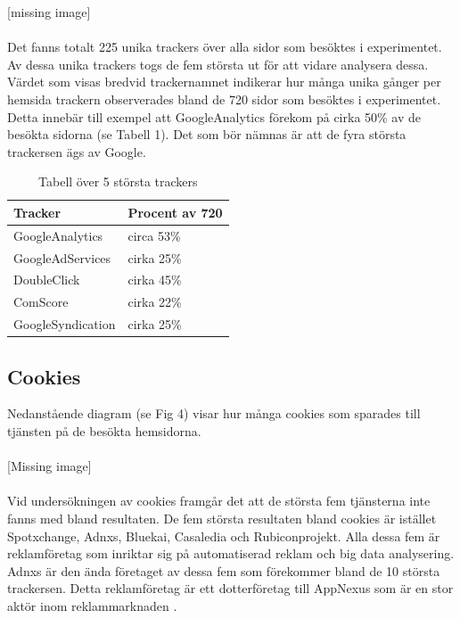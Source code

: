 \documentclass[a4paper,11pt]{article}
\begin{document}
{[missing image]\\\\


Det fanns totalt 225 unika trackers över alla sidor som besöktes i experimentet. Av dessa unika trackers togs de fem största ut för att vidare analysera dessa. Värdet som visas bredvid trackernamnet indikerar hur många unika gånger per hemsida trackern observerades bland de 720 sidor som besöktes i experimentet. Detta innebär till exempel att GoogleAnalytics förekom på cirka 50\% av de besökta sidorna (se Tabell 1). Det som bör nämnas är att de fyra största trackersen ägs av Google. 

\begin{table}
\begin{center}
    \caption{Tabell över 5 största trackers}
   \begin{tabular}{| l | l |}
   \hline
   Tracker & Procent av 720 \\ \hline
   GoogleAnalytics & circa 53\% \\ \hline
   GoogleAdServices & cirka 25\% \\ \hline
    DoubleClick & cirka 45\% \\ \hline
    ComScore & cirka 22\% \\ \hline
    GoogleSyndication & cirka 25\% \\ \hline
   \end{tabular}
\end{center}
\end{table}

\subsection{Cookies}
Nedanstående diagram (se Fig 4) visar hur många cookies som sparades till tjänsten på de besökta hemsidorna. \\\\

[Missing image] \\\\

Vid undersökningen av cookies framgår det att de största fem tjänsterna inte fanns med bland resultaten. De fem största resultaten bland cookies är istället Spotxchange, Adnxs, Bluekai, Casaledia och Rubiconprojekt.  Alla dessa fem är reklamföretag som inriktar sig på automatiserad reklam och big data analysering. Adnxs är den ända företaget av dessa fem som förekommer bland de 10 största trackersen. Detta reklamföretag är ett dotterföretag till AppNexus som är en stor aktör inom reklammarknaden \cite{Guardian}.

}
\end{document}
